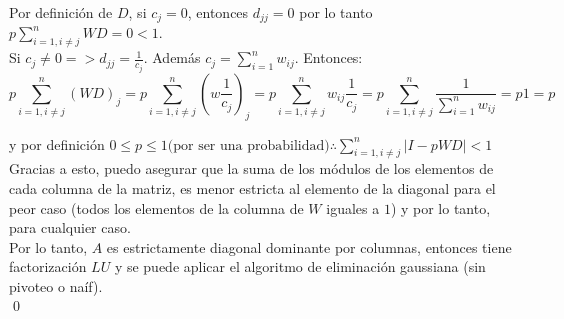 		Por definición de $D$, si $c_{j} = 0$, entonces $d_{jj} = 0$ por lo tanto $p \sum_{i=1, i \neq j}^{n} WD = 0 < 1$. \\

		Si $c_{j} \neq 0 => d_{jj} = \frac{1}{c_{j}}$. Además $c_{j} = \sum_{i=1}^{n} w_{ij}$. Entonces:\\

		\begin{equation}
			p \sum_{i=1, i \neq j}^{n} (WD)_{j} = p \sum_{i=1, i \neq j}^{n} (w \frac{1}{c_{j}})_{j} =
			p \sum_{i=1, i \neq j}^{n} w_{ij} \frac{1}{c_j} = p \sum_{i=1, i \neq j}^{n} \frac{1}{\sum_{i=1}^{n} w_{ij}} =
			p 1 = p
		\end{equation}

		y por definición $0 \leq p \leq 1 \text{(por ser una probabilidad)} \therefore \sum_{i=1, i \neq j}^{n} |I-pWD| < 1$ \\

		Gracias a esto, puedo asegurar que la suma de los módulos de los elementos de cada columna de la matriz, es menor estricta al elemento de la diagonal para el peor caso (todos los elementos de la columna de $W$ iguales a $1$) y por lo tanto, para cualquier caso. \\

		Por lo tanto, $A$ es estrictamente diagonal dominante por columnas, entonces tiene factorización $LU$ y se puede aplicar el algoritmo de eliminación gaussiana (sin pivoteo o naíf). \\

		\qed

	\clearpage

